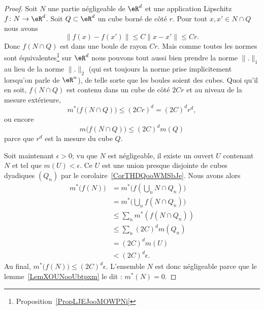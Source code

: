 				\begin{proof}
				Soit \( N\) une partie négligeable de \( \eR^d\) et une application Lipschitz \( f\colon N\to \eR^d\). Soit \( Q\subset \eR^d\) un cube borné de côté \( r\). Pour tout \( x,x'\in N\cap Q\) nous avons
				\begin{equation}
				\| f(x)-f(x') \|\leq C\| x-x' \|\leq Cr.
				\end{equation}
				Donc \( f(N\cap Q)\) est dans une boule de rayon \( Cr\). Mais comme toutes les normes sont équivalentes\footnote{Proposition~\ref{PropLJEJooMOWPNi}} sur \( \eR^d\) nous pouvons tout aussi bien prendre la norme \( \| . \|_1\) au lieu de la norme \( \| . \|_2\) (qui est toujours la norme prise implicitement lorsqu'on parle de \( \eR^n\)), de telle sorte que les boules soient des cubes. Quoi qu'il en soit, \( f(N\cap Q)\) est contenu dans un cube de côté \( 2Cr\) et au niveau de la mesure extérieure,
				\begin{equation}
				m^*\big( f(N\cap Q) \big)\leq (2Cr)^d=(2C)^dr^d,
				\end{equation}
				ou encore
				\begin{equation}
m\big(f(N\cap Q)\big)\leq (2C)^dm(Q)
	\end{equation}
	parce que \( r^d\) est la mesure du cube \( Q\).

	Soit maintenant \( \epsilon>0\); vu que \( N\) est négligeable, il existe un ouvert \( U\) contenant \( N\) et tel que \( m(U)<\epsilon\). Ce \( U\) est une union presque disjointe de cubes dyadiques \( (Q_n)\) par le corolaire~\ref{CorTHDQooWMSbJe}. Nous avons alors
	\begin{subequations}
	\begin{align}
	m^*\big( f(N) \big) & =m^*\big( f(\bigcup_nN\cap Q_n) \big) \\
												 & =m^*\big( \bigcup_nf(N\cap Q_n) \big) \\
												 & \leq \sum_nm^*(f(N\cap Q_n))          \\
												 & \leq \sum_n(2C)^dm(Q_n)               \\
												 & =(2C)^dm(U)                           \\
												 & <(2C)^d\epsilon.
												 \end{align}
												 \end{subequations}
												 Au final, \( m^*\big( f(N) \big)\leq (2C)^d\epsilon\).  L'ensemble \( N\) est donc négligeable parce que le lemme~\ref{LemXOUNooUbtpxm} le dit : \( m^*(N)=0\).
												 \end{proof}

